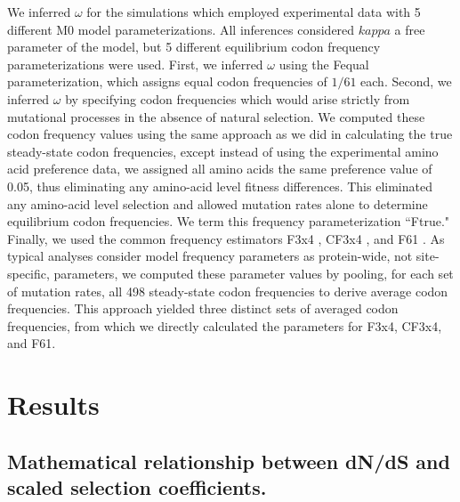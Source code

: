 \documentclass{pnastwo}
\begin{document}
We inferred $\omega$ for the simulations which employed experimental data with 5 different M0 model parameterizations. All inferences considered $kappa$ a free parameter of the model, but 5 different equilibrium codon frequency parameterizations were used. First, we inferred $\omega$ using the Fequal \cite{Yang2006} parameterization, which assigns equal codon frequencies of $1/61$ each. Second, we inferred $\omega$ by specifying codon frequencies which would arise strictly from mutational processes in the absence of natural selection. We computed these codon frequency values using the same approach as we did in calculating the true steady-state codon frequencies, except instead of using the experimental amino acid preference data, we assigned all amino acids the same preference value of 0.05, thus eliminating any amino-acid level fitness differences. This eliminated any amino-acid level selection and allowed mutation rates alone to determine equilibrium codon frequencies. We term this frequency parameterization ``Ftrue." Finally, we used the common frequency estimators F3x4 \cite{MuseGaut1994}, CF3x4 \cite{Pond2010}, and F61 \cite{GoldmanYang1994}. As typical analyses consider model frequency parameters as protein-wide, not site-specific, parameters, we computed these parameter values by pooling, for each set of mutation rates, all 498 steady-state codon frequencies to derive average codon frequencies. This approach yielded three distinct sets of averaged codon frequencies, from which we directly calculated the parameters for F3x4, CF3x4, and F61.








\section*{Results}


\subsection*{Mathematical relationship between dN/dS and scaled selection coefficients.}
\end{document}
